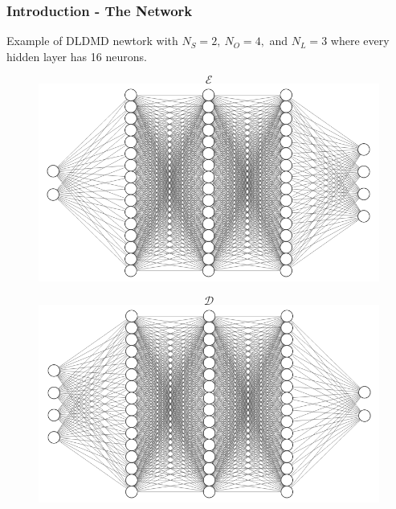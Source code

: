 \documentclass[11pt,aspectratio=169]{beamer}
\begin{document}
    \begin{frame}
        \frametitle{Introduction - The Network}
        Example of DLDMD newtork with $N_S = 2,\ N_O = 4,$ and $N_L = 3$ where every
        hidden layer has 16 neurons.
        \begin{figure}
            \centering
            \begin{minipage}{.5\textwidth}
                $$\mathcal{E}$$
                \includegraphics[width=\textwidth]{../Figures/Encoder.png}
            \end{minipage}%
            \begin{minipage}{.5\textwidth}
                $$\mathcal{D}$$
                \includegraphics[width=\textwidth]{../Figures/Decoder.png}
            \end{minipage}
        \end{figure}
    \end{frame}
\end{document}

